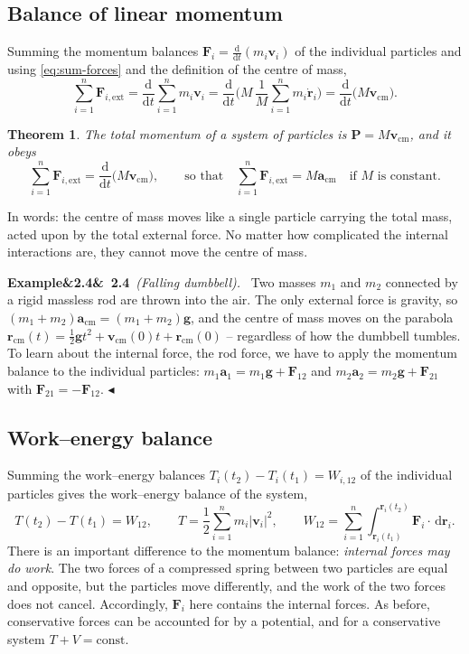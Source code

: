 \documentclass[11pt,a4paper,oneside]{report}
\numberwithin{equation}{chapter}
\newcommand{\vect}[1]{\bm{#1}}
\newcommand{\dd}{\,\mathrm{d}}
\newcommand{\dv}[2]{\frac{\mathrm{d}#1}{\mathrm{d}#2}}
\newcommand{\cm}{\mathrm{cm}}
\newcommand{\ext}{\mathrm{ext}}
\theoremstyle{plain}
\newtheorem{theorem}{Theorem}[chapter]
\theoremstyle{definition}
\theoremstyle{remark}
\newenvironment{example}[2]{%
  \par\addvspace{\bigskipamount}\noindent
  \textbf{Example\ifx&#1&\else~#1\fi}\ \textit{(#2).}\ \ignorespaces}%
  {\hfill$\blacktriangleleft$\par\addvspace{\bigskipamount}}
\begin{document}
\subsection{Balance of linear momentum}
Summing the momentum balances $\vect F_i=\frac{\mathrm d}{\mathrm dt}(m_i\vect v_i)$ of the individual particles and
using \eqref{eq:sum-forces} and the definition of the centre of mass,
\[
  \sum_{i=1}^n\vect F_{i,\ext}=\dv{}{t}\sum_{i=1}^nm_i\vect v_i=\dv{}{t}\Big(M\,\frac1M\sum_{i=1}^nm_i\dot{\vect r}_i\Big)
  =\dv{}{t}\big(M\vect v_\cm\big).
\]
\begin{theorem}
The total momentum of a system of particles is $\vect P=M\vect v_\cm$, and it obeys
\begin{equation}
  \sum_{i=1}^n\vect F_{i,\ext}=\dv{}{t}\big(M\vect v_\cm\big),\qquad\text{so that}\quad\sum_{i=1}^n\vect F_{i,\ext}=M\vect a_\cm
  \quad\text{if $M$ is constant}.
\end{equation}
\end{theorem}
In words: the centre of mass moves like a single particle carrying the total mass, acted upon by the total external
force. No matter how complicated the internal interactions are, they cannot move the centre of mass.

\begin{example}{2.4}{Falling dumbbell}
Two masses $m_1$ and $m_2$ connected by a rigid massless rod are thrown into the air. The only external force is
gravity, so $(m_1+m_2)\vect a_\cm=(m_1+m_2)\vect g$, and the centre of mass moves on the parabola
$\vect r_\cm(t)=\frac12\vect gt^2+\vect v_\cm(0)t+\vect r_\cm(0)$ -- regardless of how the dumbbell tumbles. To
learn about the internal force, the rod force, we have to apply the momentum balance to the individual particles:
$m_1\vect a_1=m_1\vect g+\vect F_{12}$ and $m_2\vect a_2=m_2\vect g+\vect F_{21}$ with $\vect F_{21}=-\vect F_{12}$.
\end{example}

\subsection{Work--energy balance}
Summing the work--energy balances $T_i(t_2)-T_i(t_1)=W_{i,12}$ of the individual particles gives the work--energy
balance of the system,
\begin{equation}
  T(t_2)-T(t_1)=W_{12},\qquad T=\frac12\sum_{i=1}^nm_i|\vect v_i|^2,\qquad
  W_{12}=\sum_{i=1}^n\int_{\vect r_i(t_1)}^{\vect r_i(t_2)}\vect F_i\cdot\dd\vect r_i .
\end{equation}
There is an important difference to the momentum balance: \emph{internal forces may do work}. The two forces of a
compressed spring between two particles are equal and opposite, but the particles move differently, and the work
of the two forces does not cancel. Accordingly, $\vect F_i$ here contains the internal forces. As before, conservative
forces can be accounted for by a potential, and for a conservative system $T+V=\text{const}$.
\end{document}
